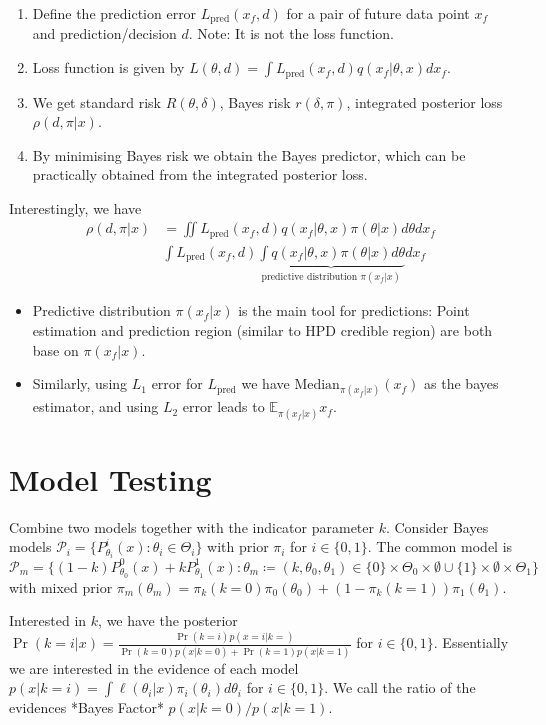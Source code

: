 \documentclass[5pt,a4paper, twocolumn]{article}
\newcommand{\topic}[1]{\section*{#1}}
\begin{document}
{\begin{enumerate}
    \item Define the prediction error $L_{\text{pred}}(x_f, d)$ for a pair of future data point $x_f$ and prediction/decision $d$. Note: It is not the loss function.
    \item Loss function is given by $L(\theta, d) = \int L_{\text{pred}}(x_f, d)q(x_f \vert \theta, x)d x_f$.
    \item We get standard risk $R(\theta, \delta)$, Bayes risk $r(\delta, \pi)$, integrated posterior loss $\rho(d, \pi \vert x)$. 
    \item By minimising Bayes risk we obtain the Bayes predictor, which can be practically obtained from the integrated posterior loss.
\end{enumerate}

Interestingly, we have 
\begin{align}
\rho(d, \pi \vert x) &= \iint L_{\text{pred}}(x_f, d)q(x_f \vert \theta, x)\pi(\theta \vert x)d\theta dx_f \\
& \int L_{\text{pred}}(x_f, d) \underbrace{\int q(x_f \vert \theta, x)\pi(\theta \vert x)d\theta}_{\text{predictive distribution } \pi(x_f \vert x)} dx_f
\end{align}

\begin{itemize}
    \item Predictive distribution $\pi(x_f \vert x)$ is the main tool for predictions: Point estimation and prediction region (similar to HPD credible region) are both base on $\pi(x_f \vert x)$.
    \item Similarly, using $L_1$ error for $L_{\text{pred}}$ we have $\text{Median}_{\pi(x_f \vert x)}(x_f)$ as the bayes estimator, and using $L_2$ error leads to $\mathbb{E}_{\pi(x_f \vert x)}x_f$.
\end{itemize}

\topic{Model Testing}
Combine two models together with the indicator parameter $k$.
Consider Bayes models $\mathcal{P}_i = \{P^i_{\theta_i}(x) \colon \theta_i\in\Theta_i\}$ with prior $\pi_i$ for $i\in\{0,1\}$. The common model is $\mathcal{P}_m = \{(1-k)P^0_{\theta_0}(x) + kP^1_{\theta_1}(x) \colon \theta_m \coloneqq (k, \theta_0, \theta_1) \in\{0\}\times\Theta_0\times\emptyset \cup \{1\}\times\emptyset \times \Theta_1\}$ with mixed prior $\pi_m(\theta_m)=\pi_k(k=0)\pi_0(\theta_0) + (1-\pi_k(k=1))\pi_1(\theta_1)$.

Interested in $k$, we have the posterior $\Pr(k=i \vert x) = \frac{\Pr(k=i) p(x=i \vert k=)}{\Pr(k=0)p(x \vert k=0) + \Pr(k=1)p(x \vert k=1)}$ for $i\in\{0,1\}$. Essentially we are interested in the evidence of each model $p(x \vert k=i)=\int \ell(\theta_i \vert x)\pi_i(\theta_i)d\theta_i$ for $i\in\{0,1\}$. We call the ratio of the evidences *Bayes Factor* $p(x \vert k=0) / p(x \vert k=1)$.


}
\end{document}
